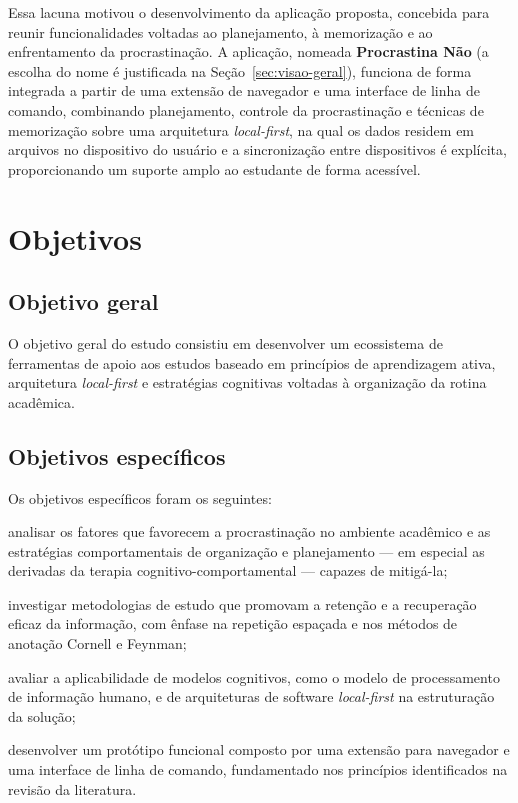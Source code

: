 \documentclass[12pt, %
openright, 
oneside,
a4paper,
english,   %
brazil]{facom-ufu-abntex2}
\begin{document}
Essa lacuna motivou o desenvolvimento da aplicação proposta, concebida para reunir funcionalidades voltadas ao planejamento, à memorização e ao enfrentamento da procrastinação. A aplicação, nomeada \textbf{Procrastina Não} (a escolha do nome é justificada na Seção~\ref{sec:visao-geral}), funciona de forma integrada a partir de uma extensão de navegador e uma interface de linha de comando, combinando planejamento, controle da procrastinação e técnicas de memorização sobre uma arquitetura \textit{local-first}, na qual os dados residem em arquivos no dispositivo do usuário e a sincronização entre dispositivos é explícita, proporcionando um suporte amplo ao estudante de forma acessível.

\section{Objetivos}

\subsection{Objetivo geral}
O objetivo geral do estudo consistiu em desenvolver um ecossistema de ferramentas de apoio aos estudos baseado em princípios de aprendizagem ativa, arquitetura \textit{local-first} e estratégias cognitivas voltadas à organização da rotina acadêmica.

\subsection{Objetivos específicos}
Os objetivos específicos foram os seguintes:
\begin{alineas}
  \item analisar os fatores que favorecem a procrastinação no ambiente acadêmico e as estratégias comportamentais de organização e planejamento --- em especial as derivadas da terapia cognitivo-comportamental --- capazes de mitigá-la;
  \item investigar metodologias de estudo que promovam a retenção e a recuperação eficaz da informação, com ênfase na repetição espaçada e nos métodos de anotação Cornell e Feynman;
  \item avaliar a aplicabilidade de modelos cognitivos, como o modelo de processamento de informação humano, e de arquiteturas de software \textit{local-first} na estruturação da solução;
  \item desenvolver um protótipo funcional composto por uma extensão para navegador e uma interface de linha de comando, fundamentado nos princípios identificados na revisão da literatura.
\end{alineas}
\end{document}
